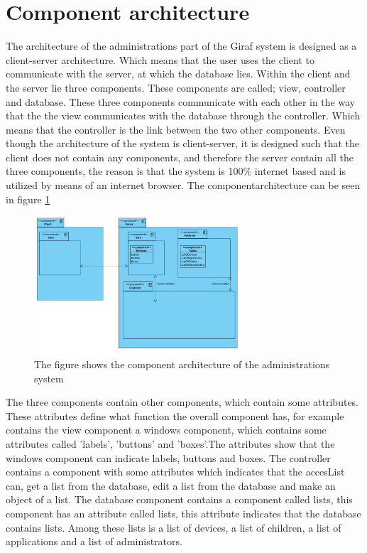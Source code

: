 \section{Component architecture}

The architecture of the administrations part of the Giraf system is designed as a client-server architecture. Which means that the user uses the client to communicate with the server, at which the database lies. Within the client and the server lie three components. These components are called; view, controller and database. These three components communicate with each other in the way that the the view communicates with the database through the controller. Which means that the controller is the link between the two other components. Even though the architecture of the system is client-server, it is designed such that the client does not contain any components, and therefore the server contain all the three components, the reason is that the system is 100\% internet based and is utilized by means of an internet browser. The componentarchitecture can be seen in figure \ref{fig:architecture}

\begin{figure}[!ht]
\centering
\includegraphics[width=300px]{img/ComponentArketektur.png}
\caption{The figure shows the component architecture of the administrations system}
\label{fig:architecture}
\end{figure}

The three components contain other components, which contain some attributes. These attributes define what function the overall component has, for example contains the view component a windows component, which contains some attributes called 'labels', 'buttons' and 'boxes'.The attributes show that the windows component can indicate labels, buttons and boxes.
The controller contains a component with some attributes which indicates that the accesList can, get a list from the database, edit a list from the database and make an object of a list.
The database component contains a component called lists, this component has an attribute called lists, this attribute indicates that the database contains lists. Among these lists is a list of devices, a list of children, a list of applications and a list of administrators.